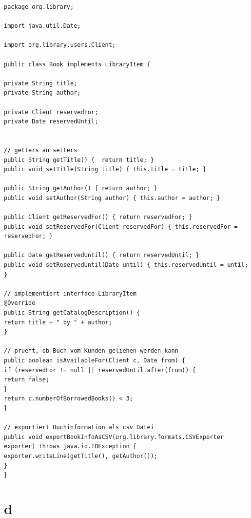 \begin{lstlisting}
package org.library;

import java.util.Date;

import org.library.users.Client;

public class Book implements LibraryItem {

private String title;
private String author;

private Client reservedFor;
private Date reservedUntil;    


// getters an setters
public String getTitle() {  return title; }
public void setTitle(String title) { this.title = title; }

public String getAuthor() { return author; }
public void setAuthor(String author) { this.author = author; }

public Client getReservedFor() { return reservedFor; }
public void setReservedFor(Client reservedFor) { this.reservedFor = reservedFor; }

public Date getReservedUntil() { return reservedUntil; }
public void setReservedUntil(Date until) { this.reservedUntil = until; }

// implementiert interface LibraryItem
@Override
public String getCatalogDescription() {
return title + " by " + author;  
}

// prueft, ob Buch vom Kunden geliehen werden kann
public boolean isAvailableFor(Client c, Date from) {
if (reservedFor != null || reservedUntil.after(from)) {
return false;
}
return c.numberOfBorrowedBooks() < 3;
}

// exportiert Buchinformation als csv Datei
public void exportBookInfoAsCSV(org.library.formats.CSVExporter exporter) throws java.io.IOException {        
exporter.writeLine(getTitle(), getAuthor());        
}    
}
\end{lstlisting}
\section*{d} 